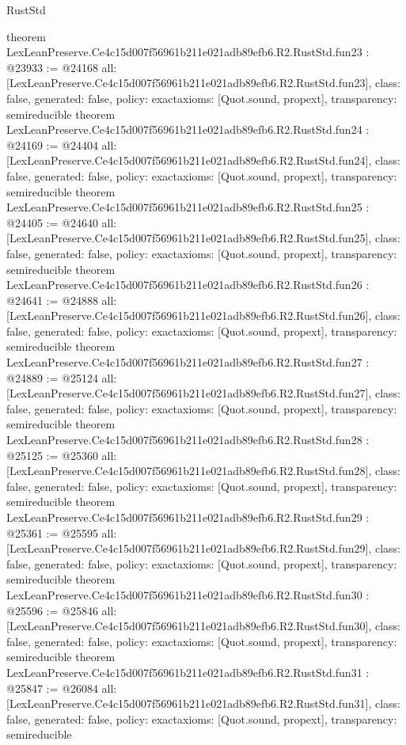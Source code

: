 \begin{lexlean}{RustStd}
\begin{coremodule}
{}
theorem LexLeanPreserve.Ce4c15d007f56961b211e021adb89efb6.R2.RustStd.fun23 : @23933 := @24168 {
  all: [LexLeanPreserve.Ce4c15d007f56961b211e021adb89efb6.R2.RustStd.fun23],
  class: false,
  generated: false,
  policy: exact{axioms: [Quot.sound, propext]},
  transparency: semireducible
}
theorem LexLeanPreserve.Ce4c15d007f56961b211e021adb89efb6.R2.RustStd.fun24 : @24169 := @24404 {
  all: [LexLeanPreserve.Ce4c15d007f56961b211e021adb89efb6.R2.RustStd.fun24],
  class: false,
  generated: false,
  policy: exact{axioms: [Quot.sound, propext]},
  transparency: semireducible
}
theorem LexLeanPreserve.Ce4c15d007f56961b211e021adb89efb6.R2.RustStd.fun25 : @24405 := @24640 {
  all: [LexLeanPreserve.Ce4c15d007f56961b211e021adb89efb6.R2.RustStd.fun25],
  class: false,
  generated: false,
  policy: exact{axioms: [Quot.sound, propext]},
  transparency: semireducible
}
theorem LexLeanPreserve.Ce4c15d007f56961b211e021adb89efb6.R2.RustStd.fun26 : @24641 := @24888 {
  all: [LexLeanPreserve.Ce4c15d007f56961b211e021adb89efb6.R2.RustStd.fun26],
  class: false,
  generated: false,
  policy: exact{axioms: [Quot.sound, propext]},
  transparency: semireducible
}
theorem LexLeanPreserve.Ce4c15d007f56961b211e021adb89efb6.R2.RustStd.fun27 : @24889 := @25124 {
  all: [LexLeanPreserve.Ce4c15d007f56961b211e021adb89efb6.R2.RustStd.fun27],
  class: false,
  generated: false,
  policy: exact{axioms: [Quot.sound, propext]},
  transparency: semireducible
}
theorem LexLeanPreserve.Ce4c15d007f56961b211e021adb89efb6.R2.RustStd.fun28 : @25125 := @25360 {
  all: [LexLeanPreserve.Ce4c15d007f56961b211e021adb89efb6.R2.RustStd.fun28],
  class: false,
  generated: false,
  policy: exact{axioms: [Quot.sound, propext]},
  transparency: semireducible
}
theorem LexLeanPreserve.Ce4c15d007f56961b211e021adb89efb6.R2.RustStd.fun29 : @25361 := @25595 {
  all: [LexLeanPreserve.Ce4c15d007f56961b211e021adb89efb6.R2.RustStd.fun29],
  class: false,
  generated: false,
  policy: exact{axioms: [Quot.sound, propext]},
  transparency: semireducible
}
theorem LexLeanPreserve.Ce4c15d007f56961b211e021adb89efb6.R2.RustStd.fun30 : @25596 := @25846 {
  all: [LexLeanPreserve.Ce4c15d007f56961b211e021adb89efb6.R2.RustStd.fun30],
  class: false,
  generated: false,
  policy: exact{axioms: [Quot.sound, propext]},
  transparency: semireducible
}
theorem LexLeanPreserve.Ce4c15d007f56961b211e021adb89efb6.R2.RustStd.fun31 : @25847 := @26084 {
  all: [LexLeanPreserve.Ce4c15d007f56961b211e021adb89efb6.R2.RustStd.fun31],
  class: false,
  generated: false,
  policy: exact{axioms: [Quot.sound, propext]},
  transparency: semireducible
}
\end{coremodule}
\end{lexlean}
